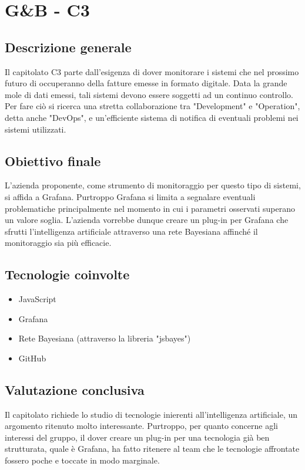 \section{G\&B - C3} \label{c3}
    \subsection{Descrizione generale}
    Il capitolato C3 parte dall'esigenza di dover monitorare i sistemi che nel prossimo futuro di occuperanno della fatture emesse in formato digitale. Data la grande mole di dati emessi, tali sistemi devono essere soggetti ad un continuo controllo. Per fare ciò si ricerca una stretta collaborazione tra "Development" e "Operation", detta anche "DevOps", e un'efficiente sistema di notifica di eventuali problemi nei sistemi utilizzati.

    \subsection{Obiettivo finale}
    L'azienda proponente, come strumento di monitoraggio per questo tipo di sistemi, si affida a Grafana. Purtroppo Grafana si limita a segnalare eventuali problematiche principalmente nel momento in cui i parametri osservati superano un valore soglia. L'azienda vorrebbe dunque creare un plug-in per Grafana che sfrutti l'intelligenza artificiale attraverso una rete Bayesiana affinché il monitoraggio sia più efficacie.

    \subsection{Tecnologie coinvolte}
    \begin{itemize}
    	\item JavaScript
    	\item Grafana
    	\item Rete Bayesiana (attraverso la libreria "jsbayes")
    	\item GitHub
    \end{itemize}

    \subsection{Valutazione conclusiva}
    Il capitolato richiede lo studio di tecnologie inierenti all'intelligenza artificiale, un argomento ritenuto molto interessante. Purtroppo, per quanto concerne agli interessi del gruppo, il dover creare un plug-in per una tecnologia già ben strutturata, quale è Grafana, ha fatto ritenere al team che le tecnologie affrontate fossero poche e toccate in modo marginale.
